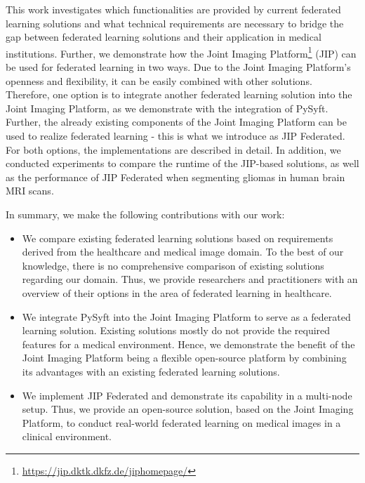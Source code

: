 This work investigates which functionalities are provided by current federated learning solutions and what technical requirements are necessary to bridge the gap between federated learning solutions and their application in medical institutions. 
Further, we demonstrate how the Joint Imaging Platform\footnote{\url{https://jip.dktk.dkfz.de/jiphomepage/}} (JIP) \citep{Scherer2020JointAnalytics} can be used for federated learning in two ways.
Due to the Joint Imaging Platform's openness and flexibility, it can be easily combined with other solutions. Therefore, one option is to integrate another federated learning solution into the Joint Imaging Platform, as we demonstrate with the integration of PySyft. Further, the already existing components of the Joint Imaging Platform can be used to realize federated learning - this is what we introduce as JIP Federated. For both options, the implementations are described in detail. 
In addition, we conducted experiments to compare the runtime of the JIP-based solutions, as well as the performance of JIP Federated when segmenting gliomas in human brain MRI scans.

In summary, we make the following contributions with our work:
\begin{itemize}
    \item We compare existing federated learning solutions based on requirements derived from the healthcare and medical image domain. To the best of our knowledge, there is no comprehensive comparison of existing solutions regarding our domain. Thus, we provide researchers and practitioners with an overview of their options in the area of federated learning in healthcare.
    \item We integrate PySyft into the Joint Imaging Platform to serve as a federated learning solution. Existing solutions mostly do not provide the required features for a medical environment. Hence, we demonstrate the benefit of the Joint Imaging Platform being a flexible open-source platform by combining its advantages with an existing federated learning solutions.
    \item We implement JIP Federated and demonstrate its capability in a multi-node setup. Thus, we provide an open-source solution, based on the Joint Imaging Platform, to conduct real-world federated learning on medical images in a clinical environment.
\end{itemize}

